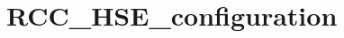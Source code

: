 \hypertarget{group___r_c_c___h_s_e__configuration}{\section{R\-C\-C\-\_\-\-H\-S\-E\-\_\-configuration}
\label{group___r_c_c___h_s_e__configuration}
}
